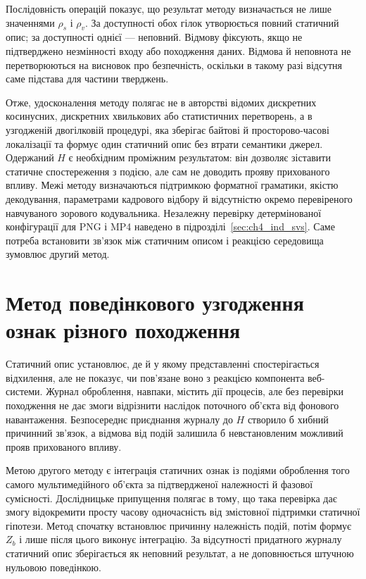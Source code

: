 Послідовність операцій показує, що результат методу визначається не лише значеннями $\rho_s$ і $\rho_v$. За доступності обох гілок утворюється повний статичний опис; за доступності однієї --- неповний. Відмову фіксують, якщо не підтверджено незмінності входу або походження даних. Відмова й неповнота не перетворюються на висновок про безпечність, оскільки в такому разі відсутня саме підстава для частини тверджень.

Отже, удосконалення методу полягає не в авторстві відомих дискретних косинусних, дискретних хвилькових або статистичних перетворень, а в узгодженій двогілковій процедурі, яка зберігає байтові й просторово-часові локалізації та формує один статичний опис без втрати семантики джерел. Одержаний $H$ є необхідним проміжним результатом: він дозволяє зіставити статичне спостереження з подією, але сам не доводить прояву прихованого впливу. Межі методу визначаються підтримкою форматної граматики, якістю декодування, параметрами кадрового відбору й відсутністю окремо перевіреного навчуваного зорового кодувальника. Незалежну перевірку детермінованої конфігурації для PNG і MP4 наведено в підрозділі~\ref{sec:ch4_ind_svs}. Саме потреба встановити зв’язок між статичним описом і реакцією середовища зумовлює другий метод.

\section{Метод поведінкового узгодження ознак різного походження}
\label{sec:behavior_alignment}

Статичний опис установлює, де й у якому представленні спостерігається відхилення, але не показує, чи пов’язане воно з реакцією компонента веб-системи. Журнал оброблення, навпаки, містить дії процесів, але без перевірки походження не дає змоги відрізнити наслідок поточного об’єкта від фонового навантаження. Безпосереднє приєднання журналу до $H$ створило б хибний причинний зв’язок, а відмова від подій залишила б невстановленим можливий прояв прихованого впливу.

Метою другого методу є інтеграція статичних ознак із подіями оброблення того самого мультимедійного об’єкта за підтвердженої належності й фазової сумісності. Дослідницьке припущення полягає в тому, що така перевірка дає змогу відокремити просту часову одночасність від змістовної підтримки статичної гіпотези. Метод спочатку встановлює причинну належність подій, потім формує $Z_b$ і лише після цього виконує інтеграцію. За відсутності придатного журналу статичний опис зберігається як неповний результат, а не доповнюється штучною нульовою поведінкою.

